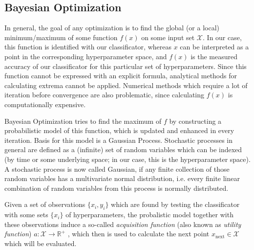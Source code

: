 \subsection{Bayesian Optimization}
In general, the goal of any optimization is to find the global (or a local) minimum/maximum of some function $f(x)$ on some input set $\mathcal{X}$. In our case, this function is identified with our classificator, whereas $x$ can be interpreted as a point in the corresponding hyperparameter space, and $f(x)$ is the measured accuracy of our classificator for this particular set of hyperparameters. Since this function cannot be expressed with an explicit formula, analytical methods for calculating extrema cannot be applied. Numerical methods which require a lot of iteration before convergence are also problematic, since calculating $f(x)$ is computationally expensive. \par
Bayesian Optimization tries to find the maximum of $f$ by constructing a probabilistic model of this function, which is updated and enhanced in every iteration. Basis for this model is a Gaussian Process. Stochastic processes in general are defined as a (infinite) set of random variables which can be indexed (by time or some underlying space; in our case, this is the hyperparameter space). A stochastic process is now called Gaussian, if any finite collection of those random variables has a multivariate normal distribution, i.e. every finite linear combination of random variables from this process is normally distributed. \par
Given a set of observations $\{x_i,y_i\}$ which are found by testing the classificator with some sets $\{x_i\}$ of hyperparameters, the probalistic model together with these observations induce a so-called \emph{acquisition function} (also known as \emph{utility function}) $a: \mathcal{X} \rightarrow \mathbb{R}^+$ , which then is used to calculate the next point $x_{\text{next}} \in \mathcal{X}$ which will be evaluated. \cite{snoek2012practical}

